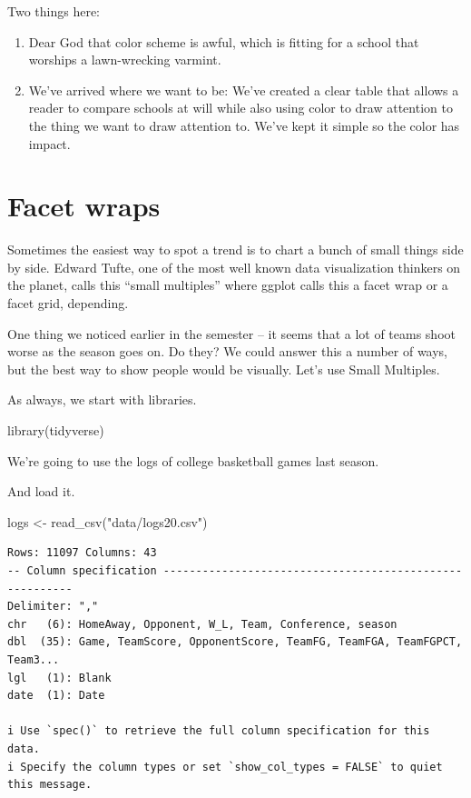 \documentclass[
  letterpaper,
  DIV=11,
  numbers=noendperiod]{scrreprt}
\newenvironment{Shaded}{\begin{snugshade}}{\end{snugshade}}
\newcommand{\FunctionTok}[1]{\textcolor[rgb]{0.28,0.35,0.67}{#1}}
\newcommand{\NormalTok}[1]{\textcolor[rgb]{0.00,0.23,0.31}{#1}}
\newcommand{\OtherTok}[1]{\textcolor[rgb]{0.00,0.23,0.31}{#1}}
\newcommand{\StringTok}[1]{\textcolor[rgb]{0.13,0.47,0.30}{#1}}
\providecommand{\tightlist}{%
  \setlength{\itemsep}{0pt}\setlength{\parskip}{0pt}}\usepackage{longtable,booktabs,array}
\begin{document}
Two things here:

\begin{enumerate}
\def\labelenumi{\arabic{enumi}.}
\tightlist
\item
  Dear God that color scheme is awful, which is fitting for a school
  that worships a lawn-wrecking varmint.
\item
  We've arrived where we want to be: We've created a clear table that
  allows a reader to compare schools at will while also using color to
  draw attention to the thing we want to draw attention to. We've kept
  it simple so the color has impact.
\end{enumerate}


\hypertarget{facet-wraps}{%
\chapter{Facet wraps}\label{facet-wraps}}

Sometimes the easiest way to spot a trend is to chart a bunch of small
things side by side. Edward Tufte, one of the most well known data
visualization thinkers on the planet, calls this ``small multiples''
where ggplot calls this a facet wrap or a facet grid, depending.

One thing we noticed earlier in the semester -- it seems that a lot of
teams shoot worse as the season goes on. Do they? We could answer this a
number of ways, but the best way to show people would be visually. Let's
use Small Multiples.

As always, we start with libraries.

\begin{Shaded}
\begin{Highlighting}[]
\FunctionTok{library}\NormalTok{(tidyverse)}
\end{Highlighting}
\end{Shaded}

We're going to use the logs of college basketball games last season.

And load it.

\begin{Shaded}
\begin{Highlighting}[]
\NormalTok{logs }\OtherTok{\textless{}{-}} \FunctionTok{read\_csv}\NormalTok{(}\StringTok{"data/logs20.csv"}\NormalTok{)}
\end{Highlighting}
\end{Shaded}

\begin{verbatim}
Rows: 11097 Columns: 43
-- Column specification --------------------------------------------------------
Delimiter: ","
chr   (6): HomeAway, Opponent, W_L, Team, Conference, season
dbl  (35): Game, TeamScore, OpponentScore, TeamFG, TeamFGA, TeamFGPCT, Team3...
lgl   (1): Blank
date  (1): Date

i Use `spec()` to retrieve the full column specification for this data.
i Specify the column types or set `show_col_types = FALSE` to quiet this message.
\end{verbatim}
\end{document}
